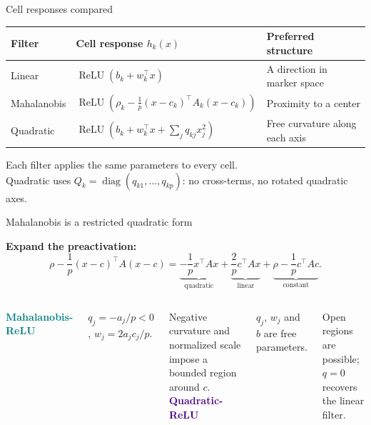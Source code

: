 \documentclass[aspectratio=169,10pt]{beamer}
\newcommand{\relu}{\operatorname{ReLU}}
\begin{document}
\begin{frame}{Cell responses compared}

\renewcommand{\arraystretch}{1.8}
\begin{tabular}{@{}p{.20\linewidth}p{.45\linewidth}p{.29\linewidth}@{}}\toprule
Filter & Cell response $h_k(x)$ & Preferred structure\\\midrule
Linear & $\relu(b_k+w_k^\top x)$ & A direction in marker space\\
Mahalanobis & $\relu\!\left(\rho_k-\frac1p(x-c_k)^\top A_k(x-c_k)\right)$ & Proximity to a center\\
Quadratic & $\relu\!\left(b_k+w_k^\top x+\sum_j q_{kj}x_j^2\right)$ & Free curvature along each axis\\\bottomrule
\end{tabular}
\vspace{3mm}
Each filter applies the same parameters to every cell.\\
Quadratic uses $Q_k=\operatorname{diag}(q_{k1},\ldots,q_{kp})$: no cross-terms, no rotated quadratic axes.

\end{frame}

\begin{frame}{Mahalanobis is a restricted quadratic form}

\textbf{Expand the preactivation:}
\[\rho-\frac1p(x-c)^\top A(x-c)
=\underbrace{-\frac1p x^\top Ax}_{\text{quadratic}}
+\underbrace{\frac2p c^\top Ax}_{\text{linear}}
+\underbrace{\rho-\frac1p c^\top Ac}_{\text{constant}}.\]
\begin{columns}[T,onlytextwidth]
\textcolor{Teal}{\textbf{Mahalanobis-ReLU}}\par
$q_j=-a_j/p<0$, $w_j=2a_jc_j/p$.\par
Negative curvature and normalized scale impose a bounded region around $c$.
\textcolor{Indigo}{\textbf{Quadratic-ReLU}}\par
$q_j$, $w_j$ and $b$ are free parameters.\par
Open regions are possible; $q=0$ recovers the linear filter.
\end{columns}

\end{frame}
\end{document}
